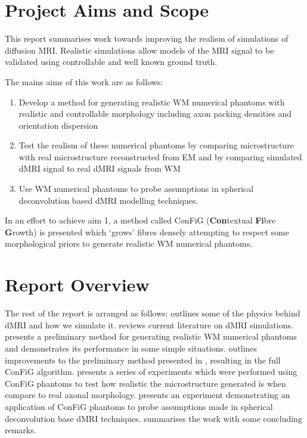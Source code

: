 \section{Project Aims and Scope}
\label{sec:intro_project_aims}
This report summarises work towards improving the realism of simulations of diffusion \ac{MRI}. Realistic simulations allow models of the MRI signal to be validated using controllable and well known ground truth.

 

The mains aims of this work are as follows:
\begin{enumerate}
\item Develop a method for generating realistic \ac{WM} numerical phantoms with realistic and controllable morphology including axon packing densities and orientation dispersion
\item Test the realism of these numerical phantoms by comparing microstructure with real microstructure reconstructed from \acl{EM} and by comparing simulated \ac{dMRI} signal to real \ac{dMRI} signals from \ac{WM}
\item Use \ac{WM} numerical phantoms to probe assumptions in spherical deconvolution based dMRI modelling techniques.
\end{enumerate}

In an effort to achieve aim 1, a method called \acs{ConFiG} (\textbf{Con}textual \textbf{Fi}bre \textbf{G}rowth) is presented which `grows' fibres densely attempting to respect some morphological priors to generate realistic \ac{WM} numerical phantoms.

\section{Report Overview}
\label{sec:intro_report_overview}
The rest of the report is arranged as follows:  outlines some of the physics behind \acl{dMRI} and how we simulate it.  reviews current literature on \ac{dMRI} simulations.~ presents a preliminary method for generating realistic \ac{WM} numerical phantoms and demonstrates its performance in some simple situations.  outlines improvements to the preliminary method presented in , resulting in the full \ac{ConFiG} algorithm.  presents a series of experiments which were performed using \ac{ConFiG} phantoms to test how realistic the microstructure generated is when compare to real axonal morphology.  presents an experiment demonstrating an application of ConFiG phantoms to probe assumptions made in spherical deconvolution base \ac{dMRI} techniques.  summarises the work with some concluding remarks.




